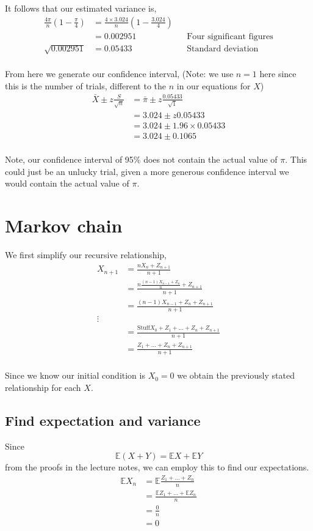 \documentclass{article}
\newcommand{\expect}{\mathbb{E}}
\begin{document}
It follows that our estimated variance is,
\begin{align*}
    \frac{4\pi}{n}\left(1-\frac{\pi}{4}\right)
    &= \frac{4\times3.024}{n}\left(1-\frac{3.024}{4}\right) \\
    &= 0.002951 && \text{Four significant figures} \\
    \sqrt{0.002951} &= 0.05433 && \text{Standard deviation} \\
\end{align*}

From here we generate our confidence interval,
(Note: we use $n=1$ here since this is the number of trials, different to the
$n$ in our equations for $X$)
\begin{align*}
    \bar{X} \pm z \frac{S}{\sqrt{n}} &= \bar{\pi} \pm z \frac{0.05433}{\sqrt{1}} \\
    &= 3.024 \pm z 0.05433 \\
    &= 3.024 \pm 1.96 \times 0.05433 \\
    &= 3.024 \pm 0.1065 \\
\end{align*}

Note, our confidence interval of 95\% does not contain the actual value
of $\pi$. This could just be an unlucky trial, given a more generous
confidence interval we would contain the actual value of $\pi$.

\section{Markov chain}
We first simplify our recursive relationship,
\begin{align*}
    X_{n+1} &= \frac{nX_n + Z_{n+1}}{n+1} \\
    &= \frac{n\frac{(n-1)X_{n-1} + Z_{n}}{n} + Z_{n+1}}{n+1} \\
    &= \frac{(n-1)X_{n-1} + Z_{n} + Z_{n+1}}{n+1} \\
    \vdots \\
    &= \frac{\text{Stuff}X_{0} + Z_1 + \dots + Z_{n} + Z_{n+1}}{n+1} \\
    &= \frac{Z_1 + \dots + Z_{n} + Z_{n+1}}{n+1} \\
\end{align*}

Since we know our initial condition is $X_0 = 0$ we obtain the previously
stated relationship for each $X$.

\subsection{Find expectation and variance}
Since
\[
    \expect(X + Y) = \expect X + \expect Y
\]
from the proofs in the lecture notes,
we can employ this to find our expectations.
\begin{align*}
    \expect X_n &= \expect \frac{Z_1 + \dots + Z_{n}}{n} \\
    &= \frac{\expect Z_1 + \dots + \expect Z_{n}}{n} \\
    &= \frac{0}{n} \\
    &= 0 \\
\end{align*}
\end{document}
